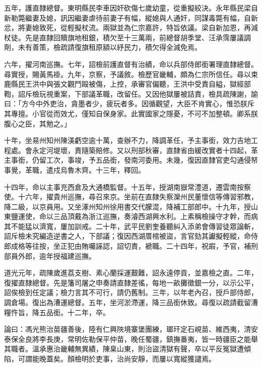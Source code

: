 \begin{pinyinscope}
五年，護直隸總督。東明縣民李車因奸砍傷七歲幼童，從重擬絞決。永年縣民梁自新勒斃繼妻及媳，訊因繼妻虐待前妻子有幅，縱媳與人通奸，同謀毒斃有幅，自新忿，將妻媳致死，從輕擬杖流。兩獄並為仁宗嘉許，特旨依議。梁自新加恩，再減杖徒。先是直隸回贖旗地租銀，積欠至十三萬兩，前總督胡季堂、汪承霈屢議調劑，未有善策，檢疏請復旗租原額以紓民力，積欠得全減免焉。

六年，擢河南巡撫。七年，詔檢前護直督有治績，命以兵部侍郎銜署理直隸總督。尋實授，賜黃馬褂。九年，京察，予議敘。檢歷官畿輔，頗為仁宗所信任。尋以束鹿縣民王洪中與張文觀鬥毆被傷，上控，承審官偏聽，王洪中受責自縊，獄經部鞫，詔斥檢玩視重案，下部議革職，改留任。又因他獄屢被詰責，檢具疏陳謝，諭曰：「方今中外吏治，貪墨者少，疲玩者多。因循觀望，大臣不肯實心，惟恐朕斥其專擅。小官從而效尤，僅知自保身家。此實國家之隱憂，不可不加整頓。卿系朕腹心之臣，其勉之。」

十年，坐易州知州陳渼虧空逾十萬，查辦不力，降調革任，予主事銜，效力吉地工程處。會永定河堤壞，責隨築賠修。又以刑部秋審，直隸省由緩改實者十四起，革主事銜，仍留工次，事竣，予五品銜，發南河委用。未幾，復因直隸官吏勾通侵帑事覺，革職，遣戍烏魯木齊。十三年，釋回。

十四年，命以主事充西倉及大通橋監督。十五年，授湖南嶽常澧道，遷雲南按察使。十六年，擢貴州巡撫，尋召來京。坐前在直隸失察灤州民董懷信等傳習邪教，降二級，以京員用。又坐涿州知州徐用書交代朦混，降補工部郎中。十九年，授山東鹽運使，命以三品頂戴為浙江巡撫，奏濬西湖興水利。上素稱檢操守才幹，而病其不能猛以濟寬，屢加訓戒。二十年，武平民劉奎養聽糾入添弟會傳習徒眾論斬，詔斥檢未究編造逆書之人，下部議；復因西湖厝棺被盜，言官劾其讞擬輕縱，命侍郎成格等往按，坐正犯由賄囑誣認，詔切責，褫職。二十四年，祝嘏，予官，補刑部員外郎，逾年授福建巡撫。

道光元年，疏陳歲進荔支樹、素心蘭採運艱難，詔永遠停貢，並嘉檢之直。二年，復擢直隸總督。先是籓司屠之申奏請直隸差徭，每地一畝攤徵銀一分，以示公平，詔俟檢到任定議；檢力言其不可行，請仍舊制。三年，以年老內召，授戶部侍郎，調倉場。復出為漕運總督。五年，坐河淤滯運，降三品銜休致。尋復以疏請截留漕糧忤旨，降五品銜。十二年，卒。

論曰：馮光熊治苗疆善後，陸有仁興陜境寨堡團練，瑯玕定石峴苗、維西夷，清安泰保全良將李長庚，常明佐勒保平仲苗，晚任蜀疆，鎮撫番夷，皆一時疆臣之能舉其職者。溫承惠治畿輔無異績，陳臬山東，則治盜清獄有聲，卒以平反冤獄遭傾陷，可謂能晚蓋矣。顏檢明於吏事，治尚安靜，而屢以寬縱獲譴焉。


\end{pinyinscope}
